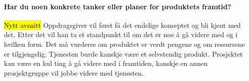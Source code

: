 \paragraph{Har du noen konkrete tanker eller planer for produktets framtid?}
\hl{Nytt avsnitt}
Oppdragsgiver vil først få det endelige konseptet og bli kjent med det. Etter det vil han ta et standpunkt til om det er noe å gå videre med og i hvilken form. Det må vurderes om produktet er verdt pengene og om ressursene er tilgjengelig. Tjenesten burde kanskje være et selvstendig produkt. Prosjektet kan være en kul ting å gå videre med i framtiden, kanskje en annen prosjektgruppe vil jobbe videre med tjenesten.




